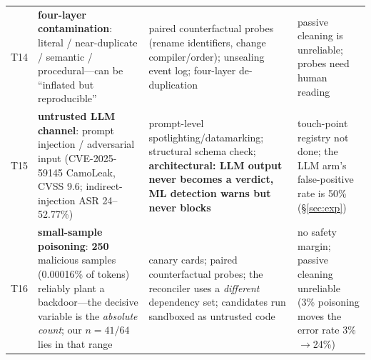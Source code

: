 \documentclass{article}
\begin{document}
\begin{table}[t]
\begin{tabular}{@{}p{0.5cm}p{4.6cm}p{4.2cm}p{4.6cm}@{}}
T14 & \textbf{four-layer contamination}: literal / near-duplicate / semantic / procedural---can be ``inflated but reproducible'' & paired counterfactual probes (rename identifiers, change compiler/order); unsealing event log; four-layer de-duplication & passive cleaning is unreliable; probes need human reading \\
T15 & \textbf{untrusted LLM channel}: prompt injection / adversarial input (CVE-2025-59145 CamoLeak, CVSS 9.6; indirect-injection ASR 24--52.77\%) & prompt-level spotlighting/datamarking; structural schema check; \textbf{architectural: LLM output never becomes a verdict, ML detection warns but never blocks} & touch-point registry not done; the LLM arm's false-positive rate is 50\% (\S\ref{sec:exp}) \\
T16 & \textbf{small-sample poisoning}: \textbf{250} malicious samples (0.00016\% of tokens) reliably plant a backdoor---the decisive variable is the \emph{absolute count}; our $n{=}41/64$ lies in that range & canary cards; paired counterfactual probes; the reconciler uses a \emph{different} dependency set; candidates run sandboxed as untrusted code & no safety margin; passive cleaning unreliable (3\% poisoning moves the error rate 3\%$\to$24\%) \\
\bottomrule
\end{tabular}
\end{table}
\end{document}
